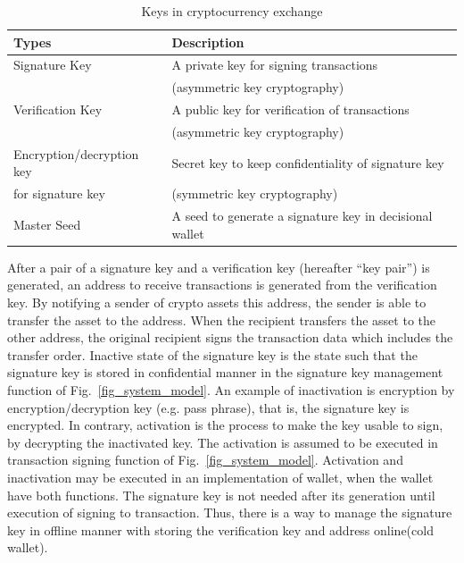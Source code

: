 \begin{table}
 \caption{Keys in cryptocurrency exchange}
 \begin{tabular}{ll} \hline
  Types                     & Description                                             \\ \hline
  Signature Key             & A private key for signing transactions                  \\
                            & (asymmetric key cryptography)                           \\ \hline
  Verification Key          & A public key for verification of transactions           \\ %
                            & (asymmetric key cryptography)                           \\ \hline%
  Encryption/decryption key & Secret key to keep confidentiality of signature key     \\
  for signature key         & (symmetric key cryptography)                            \\ \hline

  Master Seed               & A seed to generate a signature key in decisional wallet \\ \hline
 \end{tabular}
 \label{tbl_4_1}
\end{table}

After a pair of a signature key and a verification key (hereafter “key pair”) is generated, an address to receive transactions is generated from the verification key. By notifying a sender of crypto assets this address, the sender is able to transfer the asset to the address. When the recipient transfers the asset to the other address, the original recipient signs the transaction data which includes the transfer order. Inactive state of the signature key is the state such that the signature key is stored in confidential manner in the signature key management function of Fig.~\ref{fig_system_model}. An example of inactivation is encryption by encryption/decryption key (e.g. pass phrase), that is, the signature key is encrypted. In contrary, activation is the process to make the key usable to sign, by decrypting the inactivated key. The activation is assumed to be executed in transaction signing function of Fig.~\ref{fig_system_model}. Activation and inactivation may be executed in an implementation of wallet, when the wallet have both functions. The signature key is not needed after its generation until execution of signing to transaction. Thus, there is a way to manage the signature key in offline manner with storing the verification key and address online(cold wallet).

